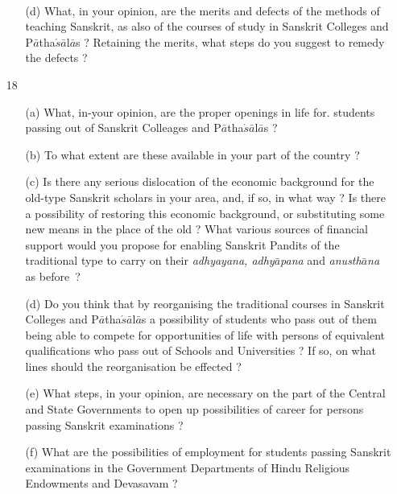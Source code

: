 {\rm 
\begin{itemize} 
\item[~]\begin{itemize}
\item[(d)] What, in your opinion, are the merits and defects of the methods of teaching Sanskrit, as also of the courses of study in Sanskrit Colleges and P$\bar{a}$tha$\acute{s}\bar{a}$l$\bar{a}$s ? Retaining the merits, what steps do you suggest to remedy the defects ?
                \end{itemize}  
     
   \item[18] \begin{itemize}
   
              \item[(a)] What, in-your opinion, are the proper openings in life for. students passing out of Sanskrit Colleages and P$\bar{a}$tha$\acute{s}\bar{a}$l$\bar{a}$s ?
              
              \item[(b)] To what extent are these available in your part of the country ?
              
              \item[(c)] Is there any serious dislocation of the economic background for the old-type Sanskrit scholars in your area, and, if so, in what way ? Is there a possibility of restoring this economic background, or substituting some new means in the place of the old ? What various sources of financial support would you propose for enabling Sanskrit Pandits of the traditional type to carry on their {\textit {adhyayana, adhy$\bar{a}$pana}} and {\textit {anusth$\bar{a}$na}} as before~? 
              
              \item[(d)] Do you think that by reorganising the traditional courses in Sanskrit Colleges and P$\bar{a}$tha$\acute{s}\bar{a}$l$\bar{a}$s a possibility of students who pass out of them being able to compete for opportunities of life with persons of equivalent qualifications who pass out of Schools and Universities ? If so, on what lines should the reorganisation be effected ?
              
              \item[(e)] What steps, in your opinion, are necessary on the part of the Central and State Governments to open up possibilities of career for persons passing Sanskrit examinations ?
              
              \item[(f)] What are the possibilities of employment for students passing Sanskrit examinations in the Government Departments of Hindu Religious Endowments and Devasavam ?
              \end{itemize}             
  

\end{itemize}}
